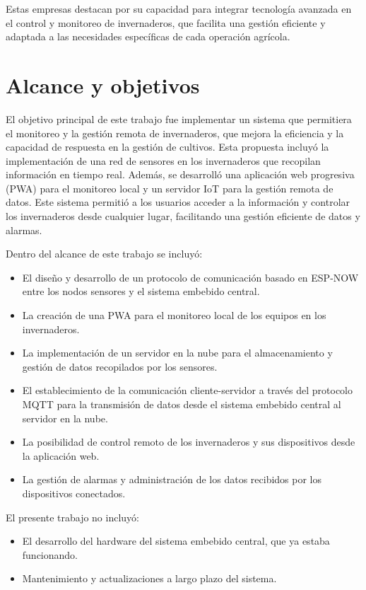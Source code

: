Estas empresas destacan por su capacidad para integrar tecnología avanzada en el control y monitoreo de invernaderos, que facilita una gestión eficiente y adaptada a las necesidades específicas de cada operación agrícola.




\section{Alcance y objetivos}

El objetivo principal de este trabajo fue implementar un sistema que permitiera el monitoreo y la gestión remota de invernaderos, que mejora la eficiencia y la capacidad de respuesta en la gestión de cultivos. Esta propuesta incluyó la implementación de una red de sensores en los invernaderos que recopilan información en tiempo real. Además, se desarrolló una aplicación web progresiva (PWA) para el monitoreo local y un servidor IoT para la gestión remota de datos. Este sistema permitió a los usuarios acceder a la información y controlar los invernaderos desde cualquier lugar, facilitando una gestión eficiente de datos y alarmas.

Dentro del alcance de este trabajo se incluyó:
\begin{itemize}
	\item El diseño y desarrollo de un protocolo de comunicación basado en ESP-NOW entre los nodos sensores y el sistema embebido central.
	\item La creación de una PWA para el monitoreo local de los equipos en los invernaderos.
	\item La implementación de un servidor en la nube para el almacenamiento y gestión de datos recopilados por los sensores.
	\item El establecimiento de la comunicación cliente-servidor a través del protocolo MQTT para la transmisión de datos desde el sistema embebido central al servidor en la nube.
	\item La posibilidad de control remoto de los invernaderos y sus dispositivos desde la aplicación web.
	\item La gestión de alarmas y administración de los datos recibidos por los dispositivos conectados.
\end{itemize}

El presente trabajo no incluyó:

\begin{itemize}
	\item El desarrollo del hardware del sistema embebido central, que ya estaba funcionando.
	\item Mantenimiento y actualizaciones a largo plazo del sistema.
\end{itemize}



